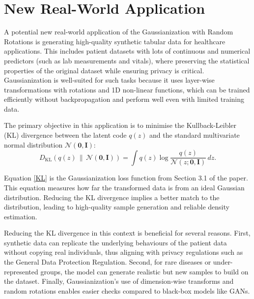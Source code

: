 \documentclass[11pt]{report} %
\begin{document}

\section{New Real-World Application}
A potential new real-world application of the Gaussianization with Random Rotations is generating high-quality synthetic tabular data for healthcare applications.\cite{pezoulas2024synthetic} This includes patient datasets with lots of continuous and numerical predictors (such as lab measurements and vitals), where preserving the statistical properties of the original dataset while ensuring privacy is critical. Gaussianization is well-suited for such tasks because it uses layer-wise transformations with rotations and 1D non-linear functions, which can be trained efficiently without backpropagation and perform well even with limited training data.

\noindent The primary objective in this application is to minimise the Kullback-Leibler (KL) divergence between the latent code \( q(z) \) and the standard multivariate normal distribution \( \mathcal{N}(\mathbf{0}, \mathbf{I}) \):
\begin{equation}
D_{\mathrm{KL}}(q(z) \, \| \, \mathcal{N}(\mathbf{0}, \mathbf{I})) = \int q(z) \log \frac{q(z)}{\mathcal{N}(z;\mathbf{0}, \mathbf{I})} \, dz.
\label{KL}
\end{equation}

\noindent Equation \ref{KL} is the Gaussianization loss function from Section 3.1 of the paper. This equation measures how far the transformed data is from an ideal Gaussian distribution. Reducing the KL divergence implies a better match to the distribution, leading to high-quality sample generation and reliable density estimation.

Reducing the KL divergence in this context is beneficial for several reasons. First, synthetic data can replicate the underlying behaviours of the patient data without copying real individuals, thus aligning with privacy regulations such as the General Data Protection Regulation. Second, for rare diseases or under-represented groups, the model can generate realistic but new samples to build on the dataset. Finally, Gaussianization's use of dimension-wise transforms and random rotations enables easier checks compared to black-box models like GANs.
\end{document}
